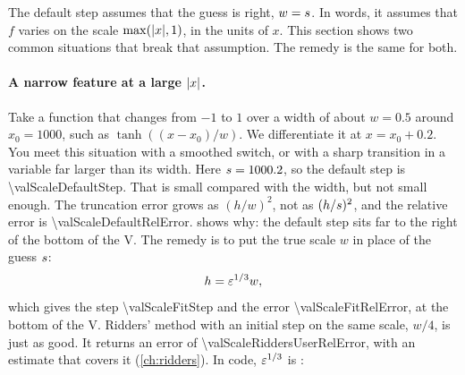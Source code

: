 The default step assumes that the guess is right, $w = s$. In words, it assumes that $f$ varies on the scale
$\max(\lvert x \rvert, 1)$, in the units of $x$. This section shows two common situations that break that assumption. The
remedy is the same for both.

\paragraph{A narrow feature at a large $\lvert x \rvert$.} Take a function that changes from $-1$ to $1$ over a width of
about $w = 0.5$ around $x_0 = 1000$, such as $\tanh((x - x_0) / w)$. We differentiate it at $x = x_0 + 0.2$. You meet
this situation with a smoothed switch, or with a sharp transition in a variable far larger than its width. Here
$s = \num{1000.2}$, so the default step is \num{\valScaleDefaultStep}. That is small compared with the width, but
not small enough. The truncation error grows as $(h/w)^2$, not as $(h/s)^2$, and the relative error is
\num{\valScaleDefaultRelError}.  shows why: the default step sits far to the right of the bottom
of the V. The remedy is to put the true scale $w$ in place of the guess $s$:
\begin{equation*}
  h = \varepsilon^{1/3} w,
\end{equation*}
which gives the step \num{\valScaleFitStep} and the error \num{\valScaleFitRelError}, at the bottom of the V. Ridders'
method with an initial step on the same scale, $w/4$, is just as good. It returns an error of
\num{\valScaleRiddersUserRelError}, with an estimate that covers it (\cref{ch:ridders}). In code, $\varepsilon^{1/3}$ is
:

\begin{figure}
\centering

\end{figure}

